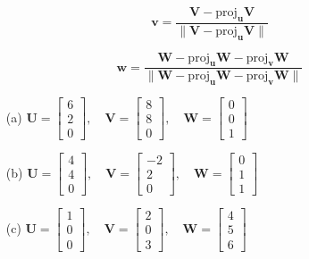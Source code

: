 \[
\mathbf{v} = \frac{\mathbf{V} - \text{proj}_{\mathbf{u}} \mathbf{V}}{\|\mathbf{V} - \text{proj}_{\mathbf{u}} \mathbf{V}\|}
\]

\[
\mathbf{w} = \frac{\mathbf{W} - \text{proj}_{\mathbf{u}} \mathbf{W} - \text{proj}_{\mathbf{v}} \mathbf{W}}{\|\mathbf{W} - \text{proj}_{\mathbf{u}} \mathbf{W} - \text{proj}_{\mathbf{v}} \mathbf{W}\|}
\]


\begin{enumerate}
    \item[(a)] 
    $\mathbf{U} = \begin{bmatrix} 6 \\ 2 \\ 0 \end{bmatrix}, \quad
    \mathbf{V} = \begin{bmatrix} 8 \\ 8 \\ 0 \end{bmatrix}, \quad
    \mathbf{W} = \begin{bmatrix} 0 \\ 0 \\ 1 \end{bmatrix}$
    
    \item[(b)] 
    $\mathbf{U} = \begin{bmatrix} 4 \\ 4 \\ 0 \end{bmatrix}, \quad
    \mathbf{V} = \begin{bmatrix} -2 \\ 2 \\ 0 \end{bmatrix}, \quad
    \mathbf{W} = \begin{bmatrix} 0 \\ 1 \\ 1 \end{bmatrix}$
    
    \item[(c)] 
    $\mathbf{U} = \begin{bmatrix} 1 \\ 0 \\ 0 \end{bmatrix}, \quad
    \mathbf{V} = \begin{bmatrix} 2 \\ 0 \\ 3 \end{bmatrix}, \quad
    \mathbf{W} = \begin{bmatrix} 4 \\ 5 \\ 6 \end{bmatrix}$
    

\end{enumerate}
